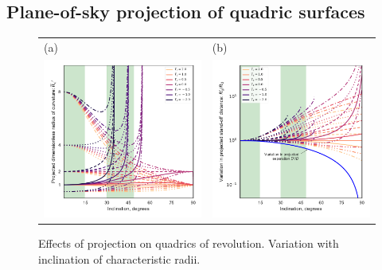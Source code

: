\subsection{Plane-of-sky projection of quadric surfaces} 

\begin{figure}
  \centering
  \begin{tabular}{ll}
    (a) & (b) \\
    \includegraphics{figs/projected-Rc-vs-i}
        & \includegraphics{figs/projected-R0-vs-i} \\
  \end{tabular}
  \caption[]{Effects of projection on quadrics of revolution.
    Variation with inclination of characteristic radii.}
  \label{fig:quadric-projection}
\end{figure}

